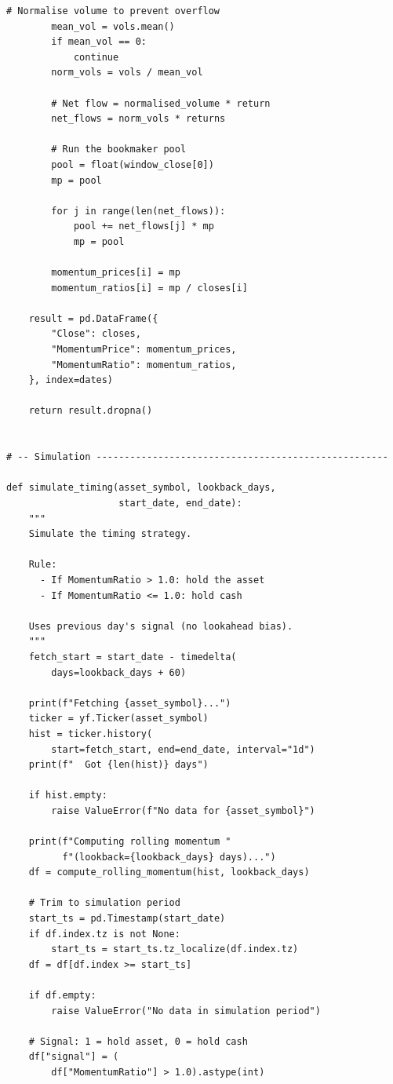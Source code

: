 \documentclass[11pt,a4paper]{article}
\begin{document}
\begin{codebox}
\begin{lstlisting}[style=python]
        # Normalise volume to prevent overflow
        mean_vol = vols.mean()
        if mean_vol == 0:
            continue
        norm_vols = vols / mean_vol

        # Net flow = normalised_volume * return
        net_flows = norm_vols * returns

        # Run the bookmaker pool
        pool = float(window_close[0])
        mp = pool

        for j in range(len(net_flows)):
            pool += net_flows[j] * mp
            mp = pool

        momentum_prices[i] = mp
        momentum_ratios[i] = mp / closes[i]

    result = pd.DataFrame({
        "Close": closes,
        "MomentumPrice": momentum_prices,
        "MomentumRatio": momentum_ratios,
    }, index=dates)

    return result.dropna()


# -- Simulation ----------------------------------------------------

def simulate_timing(asset_symbol, lookback_days,
                    start_date, end_date):
    """
    Simulate the timing strategy.

    Rule:
      - If MomentumRatio > 1.0: hold the asset
      - If MomentumRatio <= 1.0: hold cash

    Uses previous day's signal (no lookahead bias).
    """
    fetch_start = start_date - timedelta(
        days=lookback_days + 60)

    print(f"Fetching {asset_symbol}...")
    ticker = yf.Ticker(asset_symbol)
    hist = ticker.history(
        start=fetch_start, end=end_date, interval="1d")
    print(f"  Got {len(hist)} days")

    if hist.empty:
        raise ValueError(f"No data for {asset_symbol}")

    print(f"Computing rolling momentum "
          f"(lookback={lookback_days} days)...")
    df = compute_rolling_momentum(hist, lookback_days)

    # Trim to simulation period
    start_ts = pd.Timestamp(start_date)
    if df.index.tz is not None:
        start_ts = start_ts.tz_localize(df.index.tz)
    df = df[df.index >= start_ts]

    if df.empty:
        raise ValueError("No data in simulation period")

    # Signal: 1 = hold asset, 0 = hold cash
    df["signal"] = (
        df["MomentumRatio"] > 1.0).astype(int)


\end{lstlisting}
\end{codebox}
\end{document}
